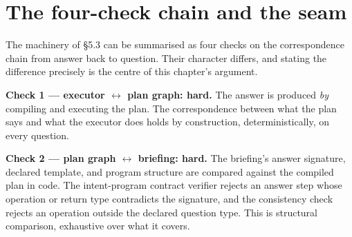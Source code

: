 \section{The four-check chain and the seam}\label{sec:the-four-check-chain-and-the-seam}

The machinery of §5.3 can be summarised as four checks on the correspondence chain from answer back to question. Their character differs, and stating the difference precisely is the centre of this chapter's argument.

\textbf{Check 1 --- executor $\leftrightarrow$ plan graph: hard.} The answer is produced \emph{by} compiling and executing the plan. The correspondence between what the plan says and what the executor does holds by construction, deterministically, on every question.

\textbf{Check 2 --- plan graph $\leftrightarrow$ briefing: hard.} The briefing's answer signature, declared template, and program structure are compared against the compiled plan in code. The intent-program contract verifier rejects an answer step whose operation or return type contradicts the signature, and the consistency check rejects an operation outside the declared question type. This is structural comparison, exhaustive over what it covers.

